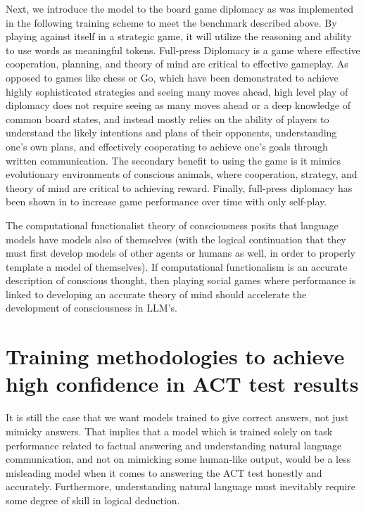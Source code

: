 \documentclass{article}
\begin{document}
Next, we introduce the model to the board game diplomacy as was implemented in \citep{fair2022diplomacy} 
the following training scheme to meet the benchmark described above. By playing against itself in a strategic game, it will utilize the reasoning and ability to use words as meaningful tokens. Full-press Diplomacy is a game where effective cooperation, planning, and theory of mind are critical to effective gameplay. As opposed to games like chess or Go, which have been demonstrated to achieve highly sophisticated strategies and seeing many moves ahead, high level play of diplomacy does not require seeing as many moves ahead or a deep knowledge of common board states, and instead mostly relies on the ability of players to understand the likely intentions and plans of their opponents, understanding one's own plans, and effectively cooperating to achieve one's goals through written communication. The secondary benefit to using the game is it mimics evolutionary environments of conscious animals, where cooperation, strategy, and theory of mind are critical to achieving reward. Finally, full-press diplomacy has been shown in \citep{fair2022diplomacy} to increase game performance over time with only self-play.

The computational functionalist theory of consciousness posits that language models have models also of themselves (with the logical continuation that they must first develop models of other agents or humans as well, in order to properly template a model of themselves). If computational functionalism is an accurate description of conscious thought, then playing social games where performance is linked to developing an accurate theory of mind should accelerate the development of consciousness in LLM's.

\section{Training methodologies to achieve high confidence in ACT test results}
It is still the case that we want models trained to give correct answers, not just mimicky answers.
That implies that a model which is trained solely on task performance related to factual answering and understanding natural language communication, and not on mimicking some human-like output, would be a less misleading model when it comes to answering the ACT test honestly and accurately. Furthermore, understanding natural language must inevitably require some degree of skill in logical deduction.
\end{document}
